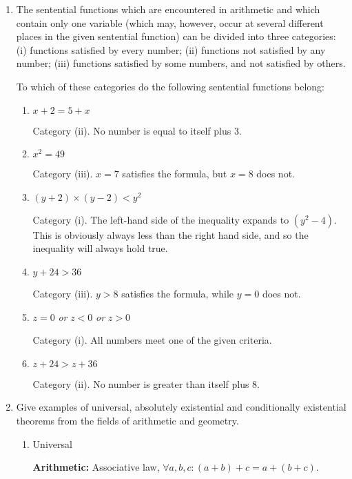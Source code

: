 \begin{enumerate}
\item The sentential functions which are encountered in arithmetic and
  which contain only one variable (which may, however, occur at
  several different places in the given sentential function) can be
  divided into three categories: (i) functions satisfied by every
  number; (ii) functions not satisfied by any number; (iii) functions
  satisfied by some numbers, and not satisfied by others.

  To which of these categories do the following sentential functions
  belong:

  \begin{enumerate}
  \item $x+2=5+x$

    Category (ii).  No number is equal to itself plus 3.

  \item $x^2=49$

    Category (iii).  $x=7$ satisfies the formula, but $x=8$ does not.

  \item $(y+2)\times(y-2)<y^2$

    Category (i).  The left-hand side of the inequality expands to
    $(y^2-4)$.  This is obviously always less than the right hand
    side, and so the inequality will always hold true.

  \item $y+24>36$

    Category (iii).  $y>8$ satisfies the formula, while $y=0$ does
    not.

  \item $z=0$ \emph{or} $z<0$ \emph{or} $z>0$

    Category (i). All numbers meet one of the given criteria.

  \item $z+24>z+36$ \hspace{1em}

    Category (ii).  No number is greater than itself plus 8.

  \end{enumerate}

\item Give examples of universal, absolutely existential and
  conditionally existential theorems from the fields of arithmetic and
  geometry.
  \begin{enumerate}
  \item Universal

    \textbf{Arithmetic:} Associative law, $\forall a, b, c :
    (a+b)+c=a+(b+c)$.


\end{enumerate}
\end{enumerate}
